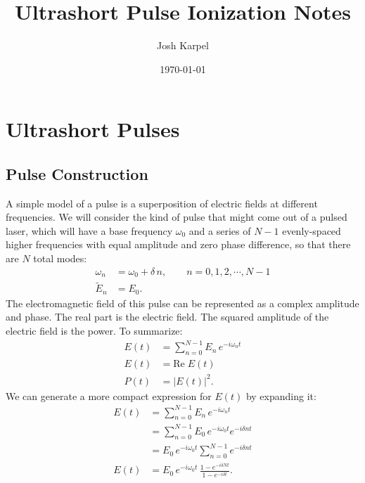 \documentclass[12pt]{article}
\newcommand{\re}{\mathrm{Re} \;}
\numberwithin{equation}{section}
\begin{document}

\title{Ultrashort Pulse Ionization Notes}
\author{Josh Karpel}
\date{\today}

\maketitle


\tableofcontents


\newpage
\section{Ultrashort Pulses}


\subsection{Pulse Construction}
A simple model of a pulse is a superposition of electric fields at different frequencies. We will consider the kind of pulse that might come out of a pulsed laser, which will have a base frequency $\omega_0$ and a series of $N-1$ evenly-spaced higher frequencies with equal amplitude and zero phase difference, so that there are $N$ total modes:
\begin{align}
\omega_n &= \omega_0 + \delta \, n, \qquad n = 0, 1, 2, \cdots, N-1 \\
\tilde{E}_n &= E_0.
\end{align}
The electromagnetic field of this pulse can be represented as a complex amplitude and phase. The real part is the electric field. The squared amplitude of the electric field is the power. To summarize:
\begin{align}
E(t) &= \sum_{n=0}^{N-1} E_n \, e^{-i \omega_n t} \\
E(t) &=  \re E(t) \\
P(t) &= |E(t)|^2.
\end{align}
We can generate a more compact expression for $E(t)$ by expanding it:
\begin{align}
E(t) &= \sum_{n=0}^{N-1} E_n \, e^{-i \omega_n t} \nonumber \\
&= \sum_{n=0}^{N-1} E_0 \, e^{-i \omega_0 t} e^{-i \delta n t} \\
&= E_0 \, e^{-i \omega_0 t} \sum_{n=0}^{N-1} e^{-i \delta n t} \\
E(t) &= E_0 \, e^{-i \omega_0 t} \, \frac{1-e^{-i \delta N t}}{1-e^{-i \delta t}}.
\end{align}
\end{document}
